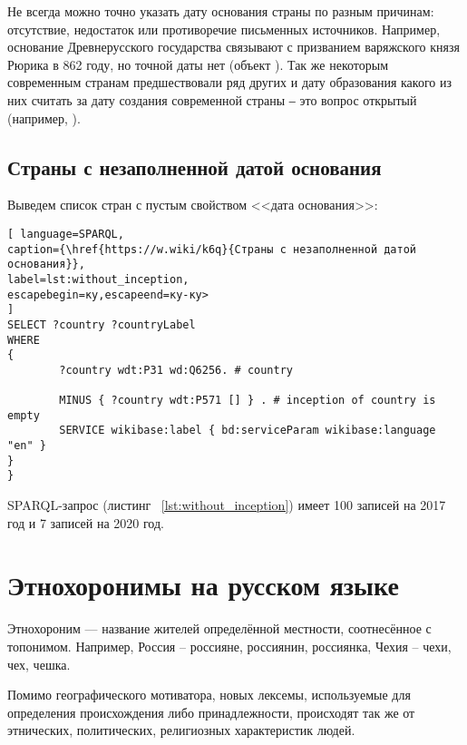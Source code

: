Не всегда можно точно указать дату основания страны по разным причинам: отсутствие, недостаток или противоречие письменных источников. Например, основание Древнерусского государства связывают с призванием варяжского князя Рюрика в 862 году, но точной даты нет (объект ). Так же некоторым современным странам предшествовали ряд других и дату образования какого из них считать за дату создания современной страны ‒ это вопрос открытый (например, ).

\subsection{Страны с незаполненной датой основания}

Выведем список стран с пустым свойством <<дата основания>>:



\begin{lstlisting}[ language=SPARQL, 
caption={\href{https://w.wiki/k6q}{Страны с незаполненной датой основания}},
label=lst:without_inception, 
escapebegin=ку,escapeend=ку-ку>
]
SELECT ?country ?countryLabel 
WHERE
{
		?country wdt:P31 wd:Q6256. # country
		
		MINUS { ?country wdt:P571 [] } . # inception of country is empty
		SERVICE wikibase:label { bd:serviceParam wikibase:language "en" }
}
}
\end{lstlisting}

SPARQL-запрос (листинг ~\ref{lst:without_inception}) имеет 100 записей на 2017 год и 7 записей на 2020 год.
\section{Этнохоронимы на русском языке}

Этнохороним — название жителей определённой местности, соотнесённое с топонимом. Например, Россия – россияне, россиянин, россиянка, Чехия – чехи, чех, чешка.

Помимо географического мотиватора, новых лексемы, используемые для определения происхождения либо принадлежности, происходят так же от этнических, политических, религиозных характеристик людей. 

